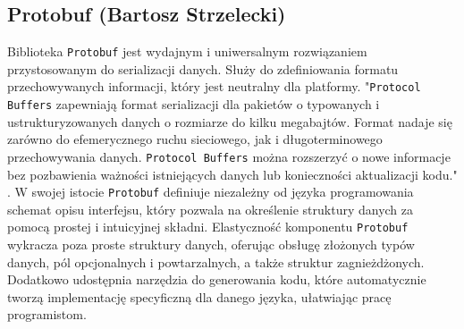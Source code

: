 \subsection{Protobuf (Bartosz Strzelecki)}\label{ss:protobuf}

Biblioteka \texttt{Protobuf} jest wydajnym i uniwersalnym rozwiązaniem przystosowanym do serializacji
danych. Służy do zdefiniowania formatu przechowywanych informacji, który jest neutralny dla platformy.
"\texttt{Protocol Buffers} zapewniają format serializacji dla pakietów o typowanych i ustrukturyzowanych danych o rozmiarze do
kilku megabajtów. Format nadaje się zarówno do efemerycznego ruchu sieciowego, jak i długoterminowego przechowywania
danych. \texttt{Protocol Buffers} można rozszerzyć o nowe informacje bez pozbawienia ważności istniejących danych lub
konieczności aktualizacji kodu." \cite{protobuf}.
W swojej istocie \texttt{Protobuf} definiuje niezależny od języka programowania schemat opisu interfejsu,
który pozwala na określenie struktury danych za pomocą prostej i intuicyjnej składni.
Elastyczność komponentu \texttt{Protobuf} wykracza poza proste struktury danych, oferując obsługę złożonych typów danych,
pól opcjonalnych i powtarzalnych,
a także struktur zagnieżdżonych. Dodatkowo udostępnia narzędzia do generowania kodu,
które automatycznie tworzą implementację specyficzną dla danego języka, ułatwiając pracę programistom.
